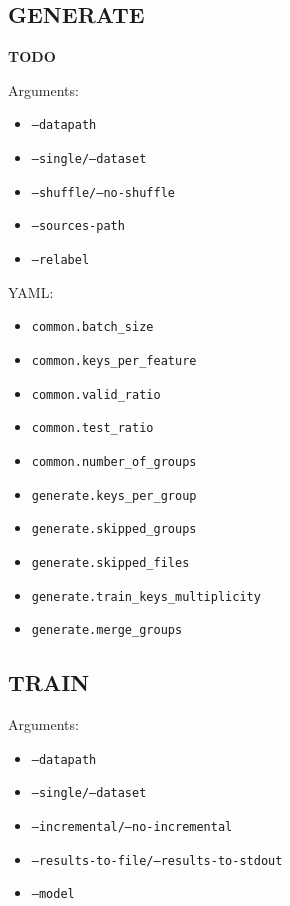 \subsection*{GENERATE}

\textbf{TODO}

\noindent
Arguments:

\begin{itemize}

\item \texttt{--datapath}
\item \texttt{--single/--dataset}
\item \texttt{--shuffle/--no-shuffle}
\item \texttt{--sources-path}
\item \texttt{--relabel}

\end{itemize}

\noindent
YAML:

\begin{itemize}

\item \texttt{common.batch\_size}
\item \texttt{common.keys\_per\_feature}
\item \texttt{common.valid\_ratio}
\item \texttt{common.test\_ratio}
\item \texttt{common.number\_of\_groups}
\item \texttt{generate.keys\_per\_group}
\item \texttt{generate.skipped\_groups}
\item \texttt{generate.skipped\_files}
\item \texttt{generate.train\_keys\_multiplicity}
\item \texttt{generate.merge\_groups}

\end{itemize}

\subsection*{TRAIN}

\noindent
Arguments:

\begin{itemize}

\item \texttt{--datapath}
\item \texttt{--single/--dataset}
\item \texttt{--incremental/--no-incremental}
\item \texttt{--results-to-file/--results-to-stdout}
\item \texttt{--model}

\end{itemize}

